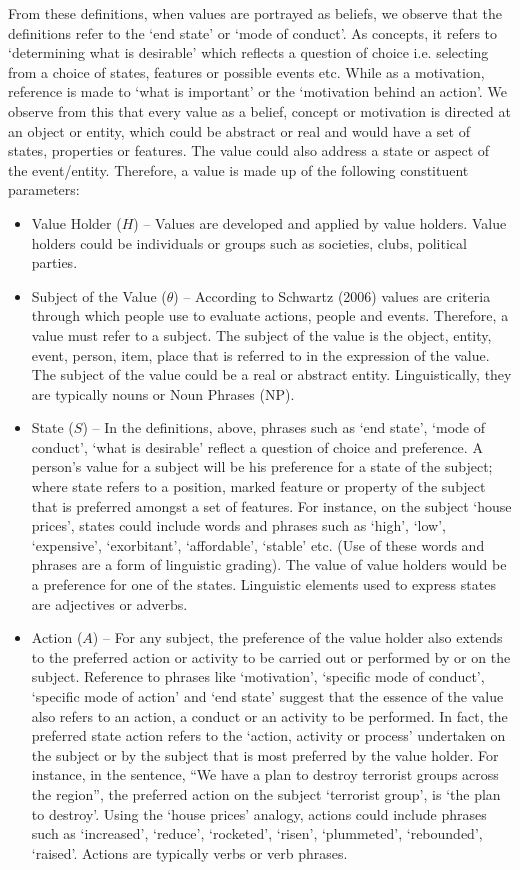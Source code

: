From these definitions, when values are portrayed as beliefs, we observe that the definitions refer to the `end state' or `mode of conduct'. As concepts, it refers to `determining what is desirable' which reflects a question of choice i.e. selecting from a choice of states, features or possible events etc. While as a motivation, reference is made to `what is important' or the `motivation behind an action'. We observe from this that every value as a belief, concept or motivation is directed at an object or entity, which could be abstract or real and would have a set of states, properties or features. The value could also address a state or aspect of the event/entity. Therefore, a value is made up of the following constituent parameters:
\begin{itemize}
\item
Value Holder ($H$) -- Values are developed and applied by value holders. Value holders could be individuals or groups such as societies, clubs, political parties. 
\item
Subject of the Value ($\theta$) -- According to Schwartz (2006) values are criteria through which people use to evaluate actions, people and events. Therefore, a value must refer to a subject. The subject of the value is the object, entity, event, person, item, place that is referred to in the expression of the value. The subject of the value could be a real or abstract entity. Linguistically, they are typically nouns or Noun Phrases (NP).
\item
State ($S$) -- In the definitions, above, phrases such as `end state', `mode of conduct', `what is desirable' reflect a question of choice and preference. A person's value for a subject will be his preference for a state of the subject; where state refers to a position, marked feature or property of the subject that is preferred amongst a set of features. For instance, on the subject `house prices', states could include words and phrases such as `high', `low', `expensive', `exorbitant', `affordable', `stable' etc. (Use of these words and phrases are a form of linguistic grading). The value of value holders would be a preference for one of the states. Linguistic elements used to express states are adjectives or adverbs.
\item
Action ($A$) -- For any subject, the preference of the value holder also extends to the preferred action or activity to be carried out or performed by or on the subject. Reference to phrases like `motivation', `specific mode of conduct', `specific mode of action' and `end state' suggest that the essence of the value also refers to an action, a conduct or an activity to be performed. In fact, the preferred state action refers to the `action, activity or process' undertaken on the subject or by the subject that is most preferred by the value holder. For instance, in the sentence, ``We have a plan to destroy terrorist groups across the region'', the preferred action on the subject `terrorist group', is `the plan to destroy'. Using the `house prices' analogy, actions could include phrases such as `increased', `reduce', `rocketed', `risen', `plummeted', `rebounded', `raised'. Actions are typically verbs or verb phrases.

\end{itemize}
